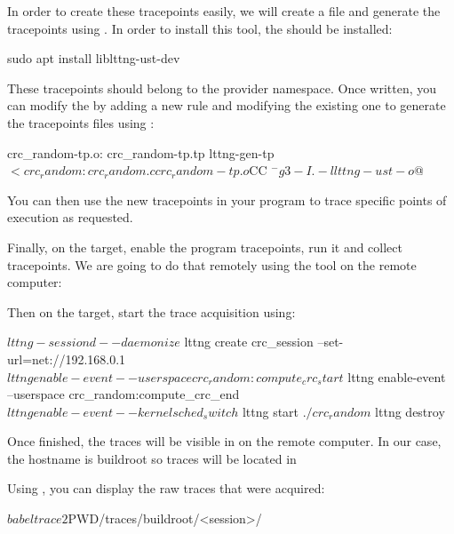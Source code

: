 In order to create these tracepoints easily, we will create a
 file and generate the tracepoints using
. In order to install this tool, the 
should be installed:

\begin{bashinput}
sudo apt install liblttng-ust-dev
\end{bashinput}

These tracepoints should belong to the 
provider namespace. Once written, you can modify the  by adding a
new rule and modifying the existing one to generate the tracepoints files using
:

\begin{bashinput}
  crc_random-tp.o: crc_random-tp.tp
    lttng-gen-tp $<
  
  crc_random: crc_random.c crc_random-tp.o
    ${CC} $^ -g3 -I. -llttng-ust -o $@
  \end{bashinput}

You can then use the new tracepoints in your program to trace specific points
of execution as requested.

Finally, on the target, enable the program tracepoints, run it and collect
tracepoints. We are going to do that remotely using the  tool
on the remote computer:


Then on the target, start the trace acquisition using:

\begin{bashinput}
$ lttng-sessiond --daemonize
$ lttng create crc_session --set-url=net://192.168.0.1
$ lttng enable-event --userspace crc_random:compute_crc_start
$ lttng enable-event --userspace crc_random:compute_crc_end
$ lttng enable-event --kernel sched_switch
$ lttng start
$ ./crc_random
$ lttng destroy
\end{bashinput}

Once finished, the traces will be visible in 
on the remote computer. In our case, the hostname is buildroot so traces will be
located in 

Using , you can display the raw traces that were acquired:
\begin{bashinput}
$ babeltrace2 $PWD/traces/buildroot/<session>/
\end{bashinput}

